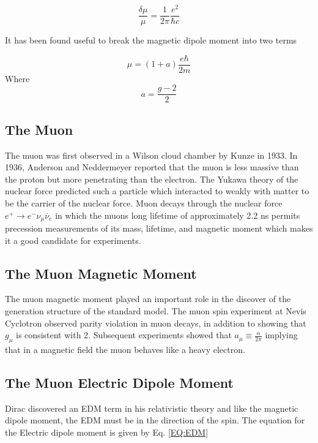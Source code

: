 \documentclass[./Thesis]{subfiles}
\begin{document}
	\begin{equation}
	\frac{\delta\mu}{\mu}  = \frac{1}{2 \pi } \frac{e^2}{\hbar c}
	\end{equation}
	
It has been found useful to break the magnetic dipole moment into two terms 
	
	\begin{equation}
	\mu = (1+a)\frac{e\hbar}{2m}
	\end{equation}
	Where
	\begin{equation}
	a = \frac{g-2}{2}
	\end{equation}
	
	
\subsection{The Muon}
	The muon was first observed in a Wilson cloud chamber by Kunze in 1933. In 1936, Anderson and Neddermeyer reported that the muon is less massive than the proton but more penetrating than the electron. The Yukawa theory of the nuclear force predicted such a particle which interacted to weakly with matter to be the carrier of the nuclear force. Muon decays through the nuclear force $e^+ \rightarrow e^{-}\nu_{\mu}\overline{\nu}_{e}$ in which the muons long lifetime of approximately 2.2 ns permits precession measurements of its mass, lifetime, and magnetic moment which makes it a good candidate for experiments.

\subsection{The Muon Magnetic Moment}
	The muon magnetic moment played an important role in the discover of the generation structure of the standard model. The muon spin experiment at Nevis Cyclotron observed parity violation in muon decays, in addition to showing that $g_\mu$ is consistent with 2. Subsequent experiments showed that $a_\mu \equiv \frac{\alpha}{2\pi} $ implying that in a magnetic field the muon behaves like a heavy electron.


\subsection{The Muon Electric Dipole Moment}


	Dirac discovered an EDM term in his relativistic theory and like the magnetic dipole moment, the EDM must be in the direction of the spin. The equation for the Electric dipole moment is given by Eq. \ref{EQ:EDM}
	
\end{document}

